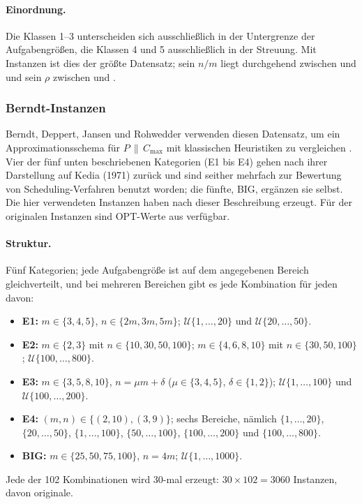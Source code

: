 \paragraph{Einordnung.}
Die Klassen 1--3 unterscheiden sich ausschließlich in der Untergrenze der Aufgabengrößen,
die Klassen 4 und 5 ausschließlich in der Streuung.
Mit \EvalInstanzenLawrinenko{} Instanzen ist dies der größte Datensatz; sein $n/m$ liegt
durchgehend zwischen \EvalNMMinLawrinenko{} und \EvalNMMaxLawrinenko{} und sein $\rho$ zwischen
\EvalRhoMinLawrinenko{} und \EvalRhoMaxLawrinenko.

\subsubsection{Berndt-Instanzen}
\label{sub:bench-berndt}

Berndt, Deppert, Jansen und Rohwedder verwenden diesen Datensatz, um ein Approximationsschema
für $P\,\|\,C_{\max}$ mit klassischen Heuristiken zu vergleichen \cite{berndt2022}.
Vier der fünf unten beschriebenen Kategorien (E1 bis E4) gehen nach ihrer Darstellung auf
Kedia (1971) zurück und sind seither mehrfach zur Bewertung von Scheduling-Verfahren benutzt
worden; die fünfte, BIG, ergänzen sie selbst.
Die hier verwendeten Instanzen haben \textcite{akram2025} nach dieser Beschreibung erzeugt.
Für \EvalOptBekanntBerndt{} der \EvalInstanzenBerndt{} originalen Instanzen sind OPT-Werte
aus \textcite{akram2025} verfügbar.

\paragraph{Struktur.}
Fünf Kategorien; jede Aufgabengröße ist auf dem angegebenen Bereich gleichverteilt, und bei
mehreren Bereichen gibt es jede Kombination für jeden davon:
\begin{itemize}[nosep]
  \item \textbf{E1:} $m \in \{3,4,5\}$, $n \in \{2m,3m,5m\}$; $\mathcal{U}\{1,\ldots,20\}$ und
    $\mathcal{U}\{20,\ldots,50\}$.
  \item \textbf{E2:} $m \in \{2,3\}$ mit $n \in \{10,30,50,100\}$;
    $m \in \{4,6,8,10\}$ mit $n \in \{30,50,100\}$; $\mathcal{U}\{100,\ldots,800\}$.
  \item \textbf{E3:} $m \in \{3,5,8,10\}$, $n = \mu m + \delta$ ($\mu \in \{3,4,5\}$, $\delta \in \{1,2\}$);
    $\mathcal{U}\{1,\ldots,100\}$ und $\mathcal{U}\{100,\ldots,200\}$.
  \item \textbf{E4:} $(m,n) \in \{(2,10),(3,9)\}$; sechs Bereiche, nämlich
    $\{1,\ldots,20\}$, $\{20,\ldots,50\}$, $\{1,\ldots,100\}$, $\{50,\ldots,100\}$,
    $\{100,\ldots,200\}$ und $\{100,\ldots,800\}$.
  \item \textbf{BIG:} $m \in \{25,50,75,100\}$, $n = 4m$; $\mathcal{U}\{1,\ldots,1000\}$.
\end{itemize}
Jede der 102 Kombinationen wird 30-mal erzeugt: $30 \times 102 = 3060$ Instanzen, davon
\EvalInstanzenBerndt{} originale.

